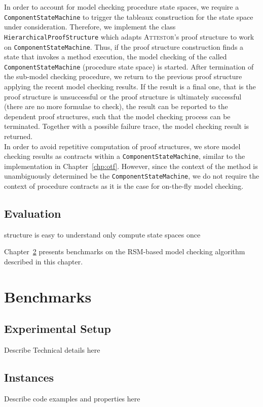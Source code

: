 \documentclass[a4paper, 12pt, twoside]{report}
\begin{document}
	In order to account for model checking procedure state spaces, we require a \texttt{ComponentStateMachine} to trigger the tableaux construction for the state space under consideration. Therefore, we implement the class \texttt{HierarchicalProofStructure} which adapts \textsc{Attestor}'s proof structure to work on \texttt{ComponentStateMachine}. Thus, if the proof structure construction finds a state that invokes a method execution, the model checking of the called \texttt{ComponentStateMachine} (procedure state space) is started. After termination of the sub-model checking procedure, we return to the previous proof structure applying the recent model checking results. If the result is a final one, that is the proof structure is unsuccessful or the proof structure is ultimately successful (there are no more formulae to check), the result can be reported to the dependent proof structures, such that the model checking process can be terminated. Together with a possible failure trace, the model checking result is returned.\\
	
	In order to avoid repetitive computation of proof structures, we store model checking results as contracts within a \texttt{ComponentStateMachine}, similar to the implementation in Chapter~\ref{chp:otf}. However, since the context of the method is unambiguously determined be the \texttt{ComponentStateMachine}, we do not require the context of procedure contracts as it is the case for on-the-fly model checking.
	
	\section{Evaluation}
	structure is easy to understand
	only compute state spaces once
	
	
	
	Chapter~\ref{chp:benchmarks} presents benchmarks on the RSM-based model checking algorithm described in this chapter.
	
	\chapter{Benchmarks}\label{chp:benchmarks}	
	
	\section{Experimental Setup}
	Describe Technical details here
	
	\section{Instances}
	Describe code examples and properties here
	
\end{document}
